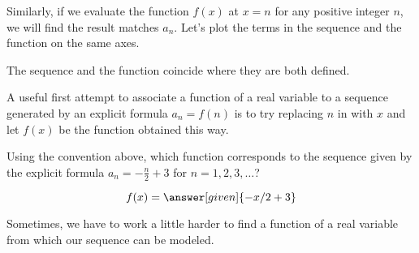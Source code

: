 \documentclass{ximera}
\begin{document}
Similarly, if we evaluate the function $f(x)$ at $x=n$ for any positive integer $n$, we will find the result matches $a_n$.  Let's plot the terms in the sequence and the function on the same axes.

\begin{image}
\end{image}

The sequence and the function coincide where they are both defined.  

A useful first attempt to associate a function of a real variable to a sequence generated by an explicit formula $a_n=f(n)$ is to try replacing $n$ in  with $x$ and let $f(x)$ be the function obtained this way.

\begin{question}
  Using the convention above, which function corresponds to the sequence given by the explicit formula
  $a_n = -\frac{n}{2}+3$ for $n=1,2,3,\dots$?
  \begin{prompt}
    \[
    f(x) = \answer[given]{-x/2 + 3}
    \]
  \end{prompt}
\end{question}

Sometimes, we have to work a little harder to find a function of a real variable from which our sequence can be modeled.  
\end{document}
